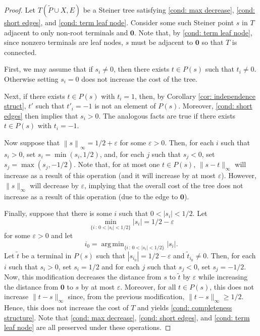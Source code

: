 \documentclass{article}\providecommand{\DeclareRedundantLanguages}[2]{}\usepackage[a4paper,margin=20mm]{geometry}
\DeclareMathOperator*{\argmin}{arg\,min}
\newcommand{\1}{\textbf{1}}
\newcommand{\norm}[1]{\left\lVert#1\right\rVert}
\renewcommand{\tilde}{\widetilde}
\begin{document}
\begin{proof}
Let $T(\tilde{P} \cup X, E)$ be a Steiner tree satisfying \ref{cond: max decrease}, \ref{cond: short edges}, and \ref{cond: term leaf node}. Consider some such Steiner point $s$ in $T$ adjacent to only non-root terminals and $\mathbf{0}$. Note that, by \ref{cond: term leaf node}, since nonzero terminals are leaf nodes, $s$ must be adjacent to $\mathbf{0}$ so that $T$ is connected.

First,  we may assume that if $s_i \neq 0$, then there exists $t \in P(s)$ such that $t_i \neq 0$. Otherwise setting $s_i = 0$ does not increase the cost of the tree.

Next, if there exists $t \in P(s)$ with $t_i = 1$, then, by Corollary \ref{cor: independence struct}, $t'$ such that $t'_i = -1$ is not an element of $P(s)$. Moreover, \ref{cond: short edges} then implies that $s_i > 0$. The analogous facts are true if there exists $t \in P(s) $ with $t_i = -1$.

Now suppose that $\norm{s}_{\infty} = 1/2 + \varepsilon$ for some $\varepsilon > 0$. Then, for each $i$ such that $s_i > 0$, set $s_i = \min(s_i, 1/2)$, and, for each $j$ such that $s_j <0$, set $s_j = \max(s_j, -1/2)$. Note that, for at most one $t \in P(s)$, $\|s - t\|_{\infty}$ will increase as a result of this operation (and it will increase by at most $\varepsilon$). However, $\|s\|_{\infty}$ will decrease by $\varepsilon$, implying that the overall cost of the tree does not increase as a result of this operation (due to the edge to $\mathbf{0}$).

Finally, suppose that there is some $i$ such that $0 < |s_i| < 1/2$. Let 
\[
\min_{\{i \,:\, 0 < |s_i| < 1/2\}} |s_i| = 1/2 - \varepsilon
\]
for some $\varepsilon > 0$ and let 
\[
i_0 = \argmin_{\{i \,:\, 0 < |s_i| < 1/2\}} |s_i|.
\]
Let $\tilde{t}$ be a terminal in $P(s)$ such that $|s_{i_0}| = 1/2 - \varepsilon$ and $\tilde{t}_{i_0} \neq 0$. Then, for each $i$ such that $s_i > 0$, set $s_i = 1/2$ and for each $j$ such that $s_j < 0$, set $s_j = -1/2$. Now, this modification decreases the distance from $s$ to $\tilde{t}$ by $\varepsilon$ while increasing the distance from $\mathbf{0}$ to $s$ by at most $\varepsilon$. Moreover, for all $t \in P(s)$, this does not increase $\|t - s\|_{\infty}$ since, from the previous modification, $\|t - s\|_{\infty} \geq 1/2$. Hence, this does not increase the cost of $T$ and yields \ref{cond: completeness structure}. Note that \ref{cond: max decrease}, \ref{cond: short edges}, and \ref{cond: term leaf node} are all preserved under these operations.
\end{proof}
\end{document}
